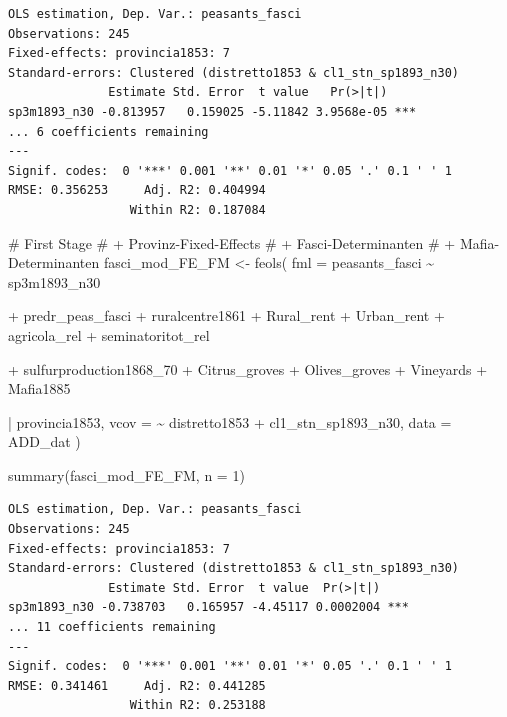 \documentclass[
  a4paper,
  DIV=11,
  oneside]{scrreprt}
\newenvironment{Shaded}{\begin{snugshade}}{\end{snugshade}}
\newcommand{\AttributeTok}[1]{\textcolor[rgb]{0.40,0.45,0.13}{#1}}
\newcommand{\CommentTok}[1]{\textcolor[rgb]{0.37,0.37,0.37}{#1}}
\newcommand{\DecValTok}[1]{\textcolor[rgb]{0.68,0.00,0.00}{#1}}
\newcommand{\FunctionTok}[1]{\textcolor[rgb]{0.28,0.35,0.67}{#1}}
\newcommand{\NormalTok}[1]{\textcolor[rgb]{0.00,0.23,0.31}{#1}}
\newcommand{\OtherTok}[1]{\textcolor[rgb]{0.00,0.23,0.31}{#1}}
\newcommand{\SpecialCharTok}[1]{\textcolor[rgb]{0.37,0.37,0.37}{#1}}
\begin{document}
\begin{verbatim}
OLS estimation, Dep. Var.: peasants_fasci
Observations: 245
Fixed-effects: provincia1853: 7
Standard-errors: Clustered (distretto1853 & cl1_stn_sp1893_n30) 
              Estimate Std. Error  t value   Pr(>|t|)    
sp3m1893_n30 -0.813957   0.159025 -5.11842 3.9568e-05 ***
... 6 coefficients remaining
---
Signif. codes:  0 '***' 0.001 '**' 0.01 '*' 0.05 '.' 0.1 ' ' 1
RMSE: 0.356253     Adj. R2: 0.404994
                 Within R2: 0.187084
\end{verbatim}

\begin{Shaded}
\begin{Highlighting}[]
\CommentTok{\# First Stage}
\CommentTok{\# + Provinz{-}Fixed{-}Effects}
\CommentTok{\# + Fasci{-}Determinanten}
\CommentTok{\# + Mafia{-}Determinanten}
\NormalTok{fasci\_mod\_FE\_FM }\OtherTok{\textless{}{-}} \FunctionTok{feols}\NormalTok{(}
  \AttributeTok{fml =}\NormalTok{ peasants\_fasci }\SpecialCharTok{\textasciitilde{}} 
\NormalTok{    sp3m1893\_n30 }
  
  \SpecialCharTok{+}\NormalTok{ predr\_peas\_fasci}
  \SpecialCharTok{+}\NormalTok{ ruralcentre1861}
  \SpecialCharTok{+}\NormalTok{ Rural\_rent}
  \SpecialCharTok{+}\NormalTok{ Urban\_rent}
  \SpecialCharTok{+}\NormalTok{ agricola\_rel}
  \SpecialCharTok{+}\NormalTok{ seminatoritot\_rel}
  
  \SpecialCharTok{+}\NormalTok{ sulfurproduction1868\_70}
  \SpecialCharTok{+}\NormalTok{ Citrus\_groves}
  \SpecialCharTok{+}\NormalTok{ Olives\_groves}
  \SpecialCharTok{+}\NormalTok{ Vineyards}
  \SpecialCharTok{+}\NormalTok{ Mafia1885}
  
  \SpecialCharTok{|}\NormalTok{ provincia1853,}
  \AttributeTok{vcov =} \SpecialCharTok{\textasciitilde{}}\NormalTok{ distretto1853 }\SpecialCharTok{+}\NormalTok{ cl1\_stn\_sp1893\_n30,}
  \AttributeTok{data =}\NormalTok{ ADD\_dat }
\NormalTok{) }

\FunctionTok{summary}\NormalTok{(fasci\_mod\_FE\_FM, }\AttributeTok{n =} \DecValTok{1}\NormalTok{)}
\end{Highlighting}
\end{Shaded}

\begin{verbatim}
OLS estimation, Dep. Var.: peasants_fasci
Observations: 245
Fixed-effects: provincia1853: 7
Standard-errors: Clustered (distretto1853 & cl1_stn_sp1893_n30) 
              Estimate Std. Error  t value  Pr(>|t|)    
sp3m1893_n30 -0.738703   0.165957 -4.45117 0.0002004 ***
... 11 coefficients remaining
---
Signif. codes:  0 '***' 0.001 '**' 0.01 '*' 0.05 '.' 0.1 ' ' 1
RMSE: 0.341461     Adj. R2: 0.441285
                 Within R2: 0.253188
\end{verbatim}
\end{document}
